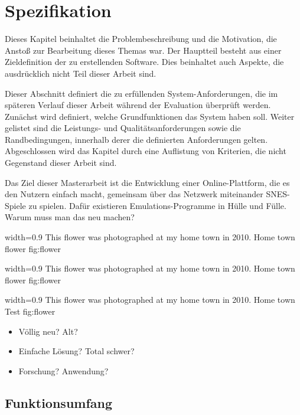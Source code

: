 \chapter{Spezifikation}\label{spezifikation}

Dieses Kapitel beinhaltet die Problembeschreibung und die Motivation,
die Anstoß zur Bearbeitung dieses Themas war. Der Hauptteil besteht aus
einer Zieldefinition der zu erstellenden Software. Dies beinhaltet auch
Aspekte, die ausdrücklich nicht Teil dieser Arbeit sind.

Dieser Abschnitt definiert die zu erfüllenden System-Anforderungen, die
im späteren Verlauf dieser Arbeit während der Evaluation überprüft
werden. Zunächst wird definiert, welche Grundfunktionen das System haben
soll. Weiter gelistet sind die Leistungs- und Qualitätsanforderungen
sowie die Randbedingungen, innerhalb derer die definierten Anforderungen
gelten. Abgeschlossen wird das Kapitel durch eine Auflistung von
Kriterien, die nicht Gegenstand dieser Arbeit sind.

\newpage

Das Ziel dieser Masterarbeit ist die Entwicklung einer Online-Plattform,
die es den Nutzern einfach macht, gemeinsam über das Netzwerk
miteinander SNES-Spiele zu spielen. Dafür existieren
Emulations-Programme in Hülle und Fülle. Warum muss man das neu machen?

   {width=0.9\textwidth}
   {This flower was photographed at my home town in 2010.}
   {Home town flower}
   {fig:flower}

   {width=0.9\textwidth}
   {This flower was photographed at my home town in 2010.}
   {Home town flower}
   {fig:flower}

   {width=0.9\textwidth}
   {This flower was photographed at my home town in 2010.}
   {Home town Test}
   {fig:flower}

\begin{itemize}
\tightlist
\item
  Völlig neu? Alt?
\item
  Einfache Lösung? Total schwer?
\item
  Forschung? Anwendung?
\end{itemize}

\section{Funktionsumfang}\label{funktionsumfang}

